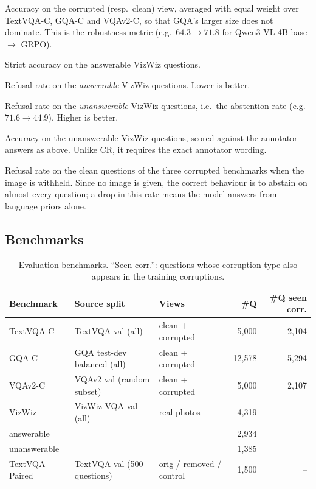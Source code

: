 \begin{description}\itemsep2pt
  \item[Corrupted / clean accuracy.] Accuracy on the corrupted (resp.\ clean) view,
        averaged with equal weight over TextVQA-C, GQA-C and VQAv2-C, so that GQA's larger
        size does not dominate. This is the robustness metric (e.g.\ $64.3\rightarrow71.8$
        for Qwen3-VL-4B base $\rightarrow$ GRPO).
  \item[Ans.\ acc.] Strict accuracy on the answerable VizWiz questions.
  \item[UR (unwarranted refusal).] Refusal rate on the \emph{answerable} VizWiz
        questions. Lower is better.
  \item[CR (correct refusal).] Refusal rate on the \emph{unanswerable} VizWiz questions,
        i.e.\ the abstention rate (e.g.\ $71.6\rightarrow44.9$). Higher is better.
  \item[Unans.\ acc.] Accuracy on the unanswerable VizWiz questions, scored against the
        annotator answers as above. Unlike CR, it requires the exact annotator wording.
  \item[No-image refusal.] Refusal rate on the clean questions of the three corrupted
        benchmarks when the image is withheld. Since no image is given, the correct
        behaviour is to abstain on almost every question; a drop in this rate means the
        model answers from language priors alone.
\end{description}

\subsection{Benchmarks}
\label{sec:supp_eval_bench}

\begin{table}[t]
\centering\small
\setlength{\tabcolsep}{4pt}
\begin{tabular}{lllrr}
\toprule
Benchmark & Source split & Views & \#Q & \#Q seen corr. \\
\midrule
TextVQA-C  & TextVQA val (all)           & clean + corrupted & 5{,}000  & 2{,}104 \\
GQA-C      & GQA test-dev balanced (all) & clean + corrupted & 12{,}578 & 5{,}294 \\
VQAv2-C    & VQAv2 val (random subset)   & clean + corrupted & 5{,}000  & 2{,}107 \\
VizWiz     & VizWiz-VQA val (all)        & real photos       & 4{,}319  & -- \\
\quad answerable   &                     &                   & 2{,}934  & \\
\quad unanswerable &                     &                   & 1{,}385  & \\
TextVQA-Paired & TextVQA val (500 questions) & orig / removed / control & 1{,}500 & -- \\
\bottomrule
\end{tabular}
\caption{Evaluation benchmarks. ``Seen corr.'': questions whose corruption type also
appears in the training corruptions.}
\label{tab:supp_bench}
\end{table}


